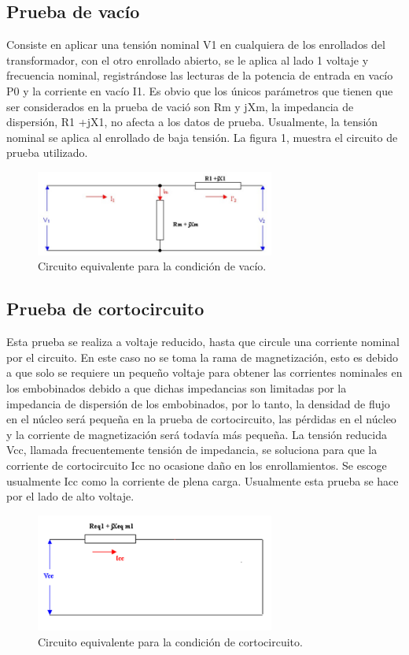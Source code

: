 \documentclass[12pt]{article}
\begin{document}
\subsection{Prueba de vacío}
Consiste en aplicar una tensión nominal V1 en cualquiera de los enrollados del transformador, con el otro enrollado abierto, se le aplica al lado 1 voltaje y frecuencia nominal, registrándose las lecturas de la potencia de entrada en vacío P0 y la corriente en vacío I1. Es obvio que los únicos parámetros que tienen que ser considerados en la prueba de vació son Rm y jXm, la impedancia de dispersión, R1 +jX1, no afecta a los datos de prueba. Usualmente, la tensión nominal se aplica al enrollado de baja tensión. La figura 1, muestra el circuito de prueba utilizado.
\begin{figure}[H]
    \centering
    \includegraphics[width=0.7\textwidth]{equivalente_vacio.png}
    \captionsetup{labelformat=empty}
    \caption{Circuito equivalente para la condición de vacío.}
\end{figure}

\subsection{Prueba de cortocircuito}
Esta prueba se realiza a voltaje reducido, hasta que circule una corriente nominal por el circuito. En este caso no se toma la rama de magnetización, esto es debido a que solo se requiere un pequeño voltaje para obtener las corrientes nominales en los embobinados debido a que dichas impedancias son limitadas por la impedancia de dispersión de los embobinados, por lo tanto, la densidad de flujo en el núcleo será pequeña en la prueba de cortocircuito, las pérdidas en el núcleo y la corriente de magnetización será todavía más pequeña. La tensión reducida Vcc, llamada frecuentemente tensión de impedancia, se soluciona para que la corriente de cortocircuito Icc no ocasione daño en los enrollamientos. Se escoge usualmente Icc como la corriente de plena carga. Usualmente esta prueba se hace por el lado de alto voltaje.
\begin{figure}[H]
    \centering
    \includegraphics[width=0.7\textwidth]{equivalente_corto.png}
    \captionsetup{labelformat=empty}
    \caption{Circuito equivalente para la condición de cortocircuito.}
\end{figure}
\end{document}
